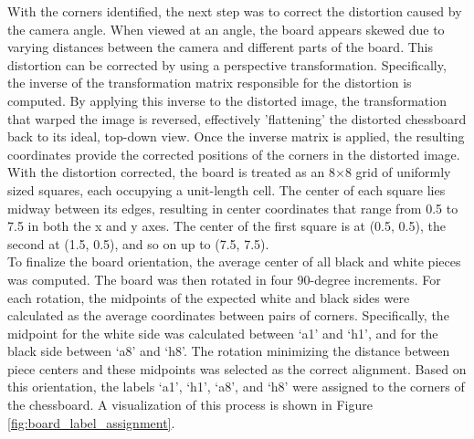 With the corners identified, the next step was to correct the distortion caused by the camera angle. When viewed at an angle, the board appears skewed due to varying distances between the camera and different parts of the board. This distortion can be corrected by using a perspective transformation. Specifically, the inverse of the transformation matrix responsible for the distortion is computed. By applying this inverse to the distorted image, the transformation that warped the image is reversed, effectively 'flattening' the distorted chessboard back to its ideal, top-down view. Once the inverse matrix is applied, the resulting coordinates provide the corrected positions of the corners in the distorted image. \\

With the distortion corrected, the board is treated as an 8×8 grid of uniformly sized squares, each occupying a unit-length cell. The center of each square lies midway between its edges, resulting in center coordinates that range from 0.5 to 7.5 in both the x and y axes. The center of the first square is at (0.5, 0.5), the second at (1.5, 0.5), and so on up to (7.5, 7.5). \\

To finalize the board orientation, the average center of all black and white pieces was computed. The board was then rotated in four 90-degree increments. For each rotation, the midpoints of the expected white and black sides were calculated as the average coordinates between pairs of corners. Specifically, the midpoint for the white side was calculated between ‘a1’ and ‘h1’, and for the black side between ‘a8’ and ‘h8’. The rotation minimizing the distance between piece centers and these midpoints was selected as the correct alignment. Based on this orientation, the labels ‘a1’, ‘h1’, ‘a8’, and ‘h8’ were assigned to the corners of the chessboard. A visualization of this process is shown in Figure \ref{fig:board_label_assignment}.
 

